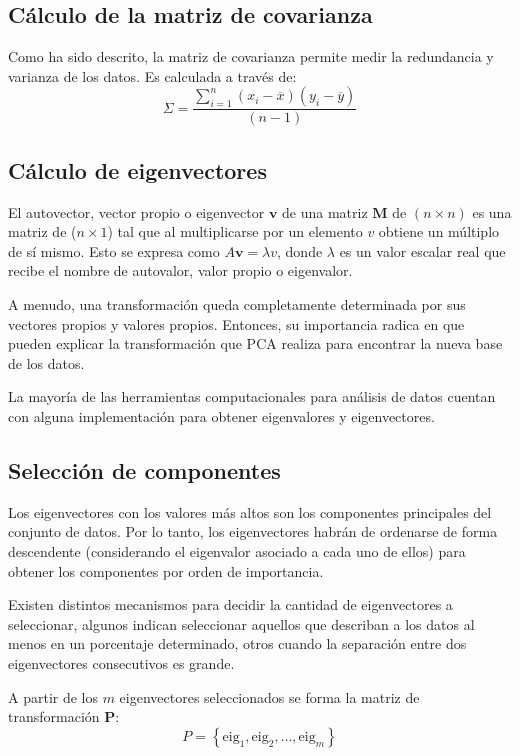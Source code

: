 \documentclass{article}
\begin{document}
\subsection{Cálculo de la matriz de covarianza} 
\label{sub:calculo_de_la_matriz_de_covarianza}
Como ha sido descrito, la matriz de covarianza permite medir la redundancia y varianza de los datos.
Es calculada a través de:
$$
\Sigma = \frac{\sum_{i=1}^n (x_i - \overline{x})(y_i - \overline{y})}{(n-1)}
$$

\subsection{Cálculo de eigenvectores}
\label{sub:calculo_de_eigenvectores}
El autovector, vector propio o eigenvector $\mathbf{v}$ de una matriz $\mathbf{M}$ de $(n \times n)$ es una matriz de ($n \times 1$) tal que al multiplicarse por un elemento $v$ obtiene un múltiplo de sí mismo.
Esto se expresa como $A\mathbf{v} = \lambda v$, donde $\lambda$ es un valor escalar real que recibe el nombre de autovalor, valor propio o eigenvalor.

A menudo, una transformación queda completamente determinada por sus vectores propios y valores propios.
Entonces, su importancia radica en que pueden explicar la transformación que PCA realiza para encontrar la nueva base de los datos.

La mayoría de las herramientas computacionales para análisis de datos cuentan con alguna implementación para obtener eigenvalores y eigenvectores.

\subsection{Selección de componentes}
\label{sub:seleccion_de_componentes}
Los eigenvectores con los valores más altos son los componentes principales del conjunto de datos. 
Por lo tanto, los eigenvectores habrán de ordenarse de forma descendente (considerando el eigenvalor asociado a cada uno de ellos) para obtener los componentes por orden de importancia.

Existen distintos mecanismos para decidir la cantidad de eigenvectores a seleccionar, algunos indican seleccionar aquellos que describan a los datos al menos en un porcentaje determinado, otros cuando la separación entre dos eigenvectores consecutivos es grande.

A partir de los $m$ eigenvectores seleccionados se forma la matriz de transformación $\mathbf{P}$:
$$
P = \left \{ \text{eig}_1,\text{eig}_2,\ldots,\text{eig}_m \right \}
$$
\end{document}
